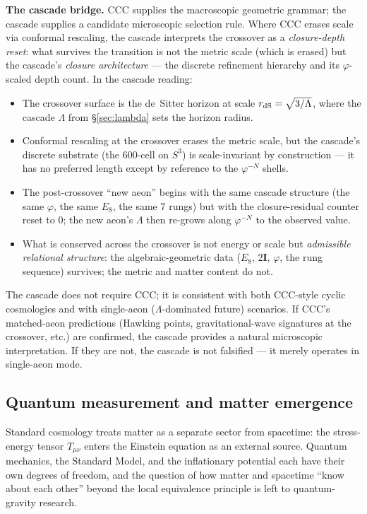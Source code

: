 \documentclass[11pt]{article}
\theoremstyle{plain}
\theoremstyle{definition}
\theoremstyle{remark}
\newcommand{\twoI}{2\mathbf{I}}
\begin{document}
\medskip
\noindent\textbf{The cascade bridge.} CCC supplies the macroscopic geometric grammar; the cascade supplies a candidate microscopic selection rule. Where CCC erases scale via conformal rescaling, the cascade interprets the crossover as a \emph{closure-depth reset}: what survives the transition is not the metric scale (which is erased) but the cascade's \emph{closure architecture} --- the discrete refinement hierarchy and its $\varphi$-scaled depth count. In the cascade reading:
\begin{itemize}[leftmargin=2em]
\item The crossover surface is the de~Sitter horizon at scale $r_{\rm dS} = \sqrt{3/\Lambda}$, where the cascade $\Lambda$ from \S\ref{sec:lambda} sets the horizon radius.
\item Conformal rescaling at the crossover erases the metric scale, but the cascade's discrete substrate (the 600-cell on $S^3$) is scale-invariant by construction --- it has no preferred length except by reference to the $\varphi^{-N}$ shells.
\item The post-crossover ``new aeon'' begins with the same cascade structure (the same $\varphi$, the same $E_8$, the same 7 rungs) but with the closure-residual counter reset to 0; the new aeon's $\Lambda$ then re-grows along $\varphi^{-N}$ to the observed value.
\item What is conserved across the crossover is not energy or scale but \emph{admissible relational structure}: the algebraic-geometric data ($E_8$, $\twoI$, $\varphi$, the rung sequence) survives; the metric and matter content do not.
\end{itemize}

The cascade does not require CCC; it is consistent with both CCC-style cyclic cosmologies and with single-aeon ($\Lambda$-dominated future) scenarios. If CCC's matched-aeon predictions (Hawking points, gravitational-wave signatures at the crossover, etc.) are confirmed, the cascade provides a natural microscopic interpretation. If they are not, the cascade is not falsified --- it merely operates in single-aeon mode.

\subsection{Quantum measurement and matter emergence}\label{sec:bridge-quantum}

Standard cosmology treats matter as a separate sector from spacetime: the stress-energy tensor $T_{\mu\nu}$ enters the Einstein equation as an external source. Quantum mechanics, the Standard Model, and the inflationary potential each have their own degrees of freedom, and the question of how matter and spacetime ``know about each other'' beyond the local equivalence principle is left to quantum-gravity research.
\end{document}
